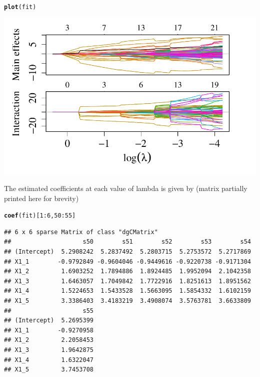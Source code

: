 \documentclass[12pt,letter]{article}\usepackage[]{graphicx}\usepackage[]{color}
\makeatletter
\newcommand{\hlnum}[1]{\textcolor[rgb]{0.686,0.059,0.569}{#1}}%
\newcommand{\hlopt}[1]{\textcolor[rgb]{0,0,0}{#1}}%
\newcommand{\hlstd}[1]{\textcolor[rgb]{0.345,0.345,0.345}{#1}}%
\newcommand{\hlkwd}[1]{\textcolor[rgb]{0.737,0.353,0.396}{\textbf{#1}}}%
\newenvironment{kframe}{%
 \def\at@end@of@kframe{}%
 \ifinner\ifhmode%
  \def\at@end@of@kframe{\end{minipage}}%
  \begin{minipage}{\columnwidth}%
 \fi\fi%
 \def\FrameCommand##1{\hskip\@totalleftmargin \hskip-\fboxsep
 \colorbox{shadecolor}{##1}\hskip-\fboxsep
     \hskip-\linewidth \hskip-\@totalleftmargin \hskip\columnwidth}%
 \MakeFramed {\advance\hsize-\width
   \@totalleftmargin\z@ \linewidth\hsize
   \@setminipage}}%
 {\par\unskip\endMakeFramed%
 \at@end@of@kframe}
\newenvironment{knitrout}{}{} %
\makeatother
\begin{document}
\begin{knitrout}\scriptsize
{}\color{fgcolor}\begin{kframe}
\begin{alltt}
\hlkwd{plot}\hlstd{(fit)}
\end{alltt}
\end{kframe}

{\centering \includegraphics[width=1\linewidth]{figure/sail-solution-path-1} 

}



\end{knitrout}


The estimated coefficients at each value of lambda is given by (matrix partially printed here for brevity)

\begin{knitrout}\scriptsize
{}\color{fgcolor}\begin{kframe}
\begin{alltt}
\hlkwd{coef}\hlstd{(fit)[}\hlnum{1}\hlopt{:}\hlnum{6}\hlstd{,}\hlnum{50}\hlopt{:}\hlnum{55}\hlstd{]}
\end{alltt}
\begin{verbatim}
## 6 x 6 sparse Matrix of class "dgCMatrix"
##                    s50        s51        s52        s53        s54
## (Intercept)  5.2908242  5.2837492  5.2803715  5.2753572  5.2717869
## X1_1        -0.9792849 -0.9604046 -0.9449616 -0.9220738 -0.9171304
## X1_2         1.6903252  1.7894886  1.8924485  1.9952094  2.1042358
## X1_3         1.6463057  1.7049842  1.7722916  1.8251613  1.8951562
## X1_4         1.5224653  1.5433528  1.5663095  1.5854332  1.6102159
## X1_5         3.3386403  3.4183219  3.4908074  3.5763781  3.6633809
##                    s55
## (Intercept)  5.2695399
## X1_1        -0.9270958
## X1_2         2.2058453
## X1_3         1.9642875
## X1_4         1.6322047
## X1_5         3.7453708
\end{verbatim}
\end{kframe}
\end{knitrout}
\end{document}
